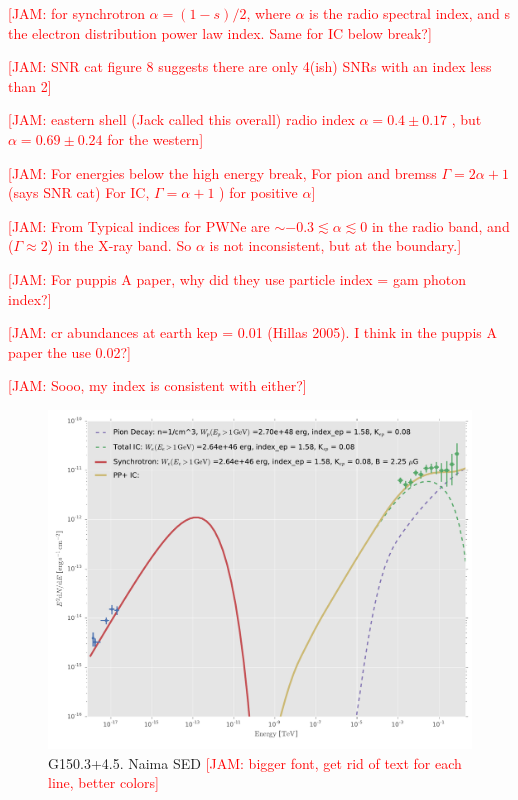 \documentclass[iop]{emulateapj}
\newcommand{\kibitz}[2]{\ifnum\Comments=1\textcolor{#1}{#2}\fi}
\newcommand{\jamie}[1]{\kibitz{red}      {[JAM: #1]}}
\newcommand{\Gone}{G150.3+4.5}
\begin{document}
\jamie{for synchrotron $\alpha = (1-s)/2$, where $\alpha$ is the radio spectral index, and s the electron distribution power law index. Same for IC below break?}

\jamie{SNR cat figure 8 suggests there are only 4(ish) SNRs with an index less than 2}

\jamie{eastern shell (Jack called this overall) radio index $\alpha = 0.4 \pm 0.17$  \cite{Gao14}, but $\alpha = 0.69 \pm 0.24$ for the western}

\jamie{For energies below the high energy break, For pion and bremss $\Gamma = 2\alpha + 1$ (says SNR cat) For IC, $\Gamma = \alpha + 1 $ ) for positive $\alpha$}

\jamie{From \cite{Gaensler06} Typical indices for PWNe are $\sim -0.3 \lesssim \alpha  \lesssim  0$ in the radio band, and ($\Gamma \approx 2$) in the X-ray band. So $\alpha$ is not inconsistent, but at the boundary.}

\jamie{For puppis A paper, why did they use particle index = gam photon index?}

\jamie{cr abundances at earth kep = 0.01  (Hillas 2005). I think in the puppis A paper the use 0.02?}

\jamie{Sooo, my index is consistent with either?}

\begin{figure}[!ht]
	\begin{centering}
		\includegraphics[width=\columnwidth]{Figures/G150_ICsync_PP_SED.pdf}
		\caption{ \Gone. Naima SED \jamie{bigger font, get rid of text for each line, better colors}}
			\label{fig:naimaSED}
	\end{centering}
\end{figure}
\end{document}
